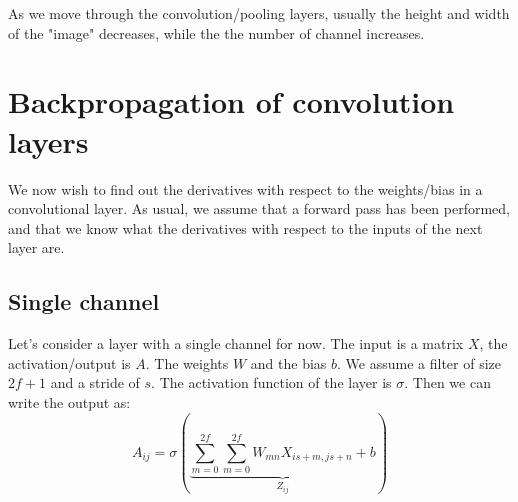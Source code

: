 \documentclass[12pt, a4paper]{article}
\numberwithin{equation}{section}
\begin{document}
As we move through the convolution/pooling layers, usually the height and width of the "image" decreases, while the the number of channel increases.

\section{Backpropagation of convolution layers}
We now wish to find out the derivatives with respect to the weights/bias in a convolutional layer. As usual, we assume that a forward pass has been performed, and that we know what the derivatives with respect to the inputs of the next layer are.

\subsection{Single channel}
Let's consider a layer with a single channel for now. The input is a matrix $X$, the activation/output is $A$. The weights $W$ and the bias $b$. We assume a filter of size $2f+1$ and a stride of $s$. The activation function of the layer is $\sigma$. Then we can write the output as:
\begin{equation}
A_{ij}=\sigma\left(\underbrace{\sum_{m=0}^{2f}\sum_{m=0}^{2f}W_{mn}X_{is+m,js+n}+b}_{Z_{ij}}\right)
\end{equation}
\end{document}
